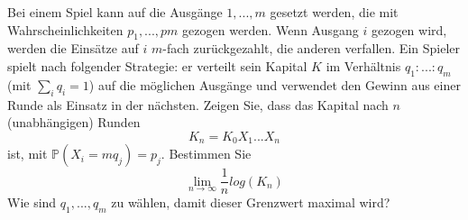 \begin{uebsp}
\begin{Exercise}[label=ex:3.5]
Bei einem Spiel kann auf die Ausgänge $1, ..., m$ gesetzt werden, die mit Wahrscheinlichkeiten $p_1 , ..., pm$ gezogen werden. Wenn Ausgang $i$ gezogen wird, werden die Einsätze auf $i$ $m$-fach zurückgezahlt, die anderen verfallen. Ein Spieler spielt nach folgender Strategie: er verteilt sein Kapital $K$ im Verhältnis $q_1: ...: q_m$ (mit $\sum_i q_i=1$) auf die möglichen Ausgänge und verwendet den Gewinn aus einer Runde als Einsatz in der nächsten.
\Question
Zeigen Sie, dass das Kapital nach $n$ (unabhängigen) Runden 
\[K_n=K_0X_1...X_n\]
ist, mit $\mathbb{P}(X_i=mq_j)=p_j$.
\Question
Bestimmen Sie
\[\lim_{n\to\infty}\frac{1}{n}log(K_n)\]
\Question
Wie sind $q_1,...,q_m$ zu wählen, damit dieser Grenzwert maximal wird?
\end{Exercise}
\begin{Answer}
\end{Answer}
\end{uebsp}
